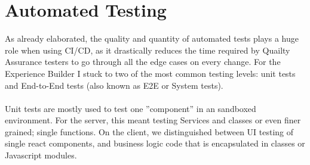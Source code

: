 \section{Automated Testing}
\label{sec:automated-testing}

As already elaborated, the quality and quantity of automated tests plays a huge role when using CI/CD, as it drastically reduces the time required by Quailty Assurance testers to go through all the edge cases on every change.
For the Experience Builder I stuck to two of the most common testing levels: unit tests and End-to-End tests (also known as E2E or System tests).
\\\\
Unit tests are mostly used to test one ''component'' in an sandboxed environment. For the server, this meant testing Services and classes or even finer grained; single functions.
On the client, we distinguished between UI testing of single react components, and business logic code that is encapsulated in classes or Javascript modules.

